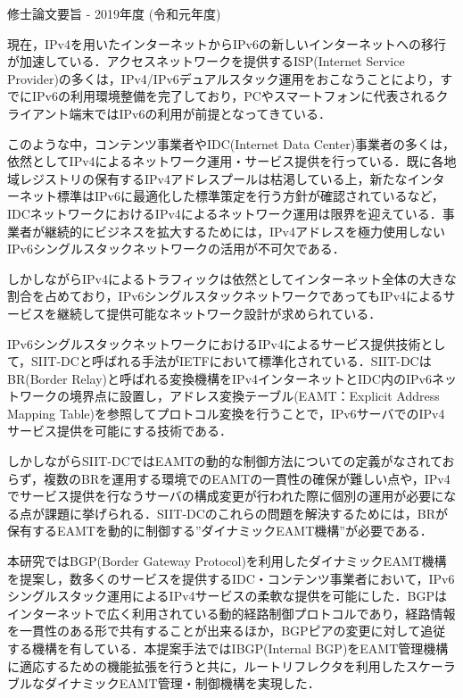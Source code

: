 修士論文要旨 - 2019年度 (令和元年度)
\begin{center}
\begin{large}
\end{large}
\end{center}

現在，IPv4を用いたインターネットからIPv6の新しいインターネットへの移行が加速している．アクセスネットワークを提供するISP(Internet Service Provider)の多くは，IPv4/IPv6デュアルスタック運用をおこなうことにより，すでにIPv6の利用環境整備を完了しており，PCやスマートフォンに代表されるクライアント端末ではIPv6の利用が前提となってきている．

このような中，コンテンツ事業者やIDC(Internet Data Center)事業者の多くは，依然としてIPv4によるネットワーク運用・サービス提供を行っている．既に各地域レジストリの保有するIPv4アドレスプールは枯渇している上，新たなインターネット標準はIPv6に最適化した標準策定を行う方針が確認されているなど，IDCネットワークにおけるIPv4によるネットワーク運用は限界を迎えている．事業者が継続的にビジネスを拡大するためには，IPv4アドレスを極力使用しないIPv6シングルスタックネットワークの活用が不可欠である．

しかしながらIPv4によるトラフィックは依然としてインターネット全体の大きな割合を占めており，IPv6シングルスタックネットワークであってもIPv4によるサービスを継続して提供可能なネットワーク設計が求められている．

IPv6シングルスタックネットワークにおけるIPv4によるサービス提供技術として，SIIT-DCと呼ばれる手法がIETFにおいて標準化されている．SIIT-DCはBR(Border Relay)と呼ばれる変換機構をIPv4インターネットとIDC内のIPv6ネットワークの境界点に設置し，アドレス変換テーブル(EAMT：Explicit Address Mapping Table)を参照してプロトコル変換を行うことで，IPv6サーバでのIPv4サービス提供を可能にする技術である．

しかしながらSIIT-DCではEAMTの動的な制御方法についての定義がなされておらず，複数のBRを運用する環境でのEAMTの一貫性の確保が難しい点や，IPv4でサービス提供を行なうサーバの構成変更が行われた際に個別の運用が必要になる点が課題に挙げられる．SIIT-DCのこれらの問題を解決するためには，BRが保有するEAMTを動的に制御する”ダイナミックEAMT機構”が必要である．

本研究ではBGP(Border Gateway Protocol)を利用したダイナミックEAMT機構を提案し，数多くのサービスを提供するIDC・コンテンツ事業者において，IPv6シングルスタック運用によるIPv4サービスの柔軟な提供を可能にした．BGPはインターネットで広く利用されている動的経路制御プロトコルであり，経路情報を一貫性のある形で共有することが出来るほか，BGPピアの変更に対して追従する機構を有している．本提案手法ではIBGP(Internal BGP)をEAMT管理機構に適応するための機能拡張を行うと共に，ルートリフレクタを利用したスケーラブルなダイナミックEAMT管理・制御機構を実現した．


